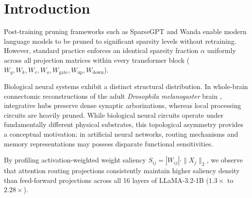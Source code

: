 \documentclass{article}
\begin{document}
\section{Introduction}
Post-training pruning frameworks such as SparseGPT \cite{frantar2023sparsegpt} and Wanda \cite{sun2023wanda} enable modern language models to be pruned to significant sparsity levels without retraining. However, standard practice enforces an identical sparsity fraction $\alpha$ uniformly across all projection matrices within every transformer block ($W_q, W_k, W_v, W_o, W_{\text{gate}}, W_{\text{up}}, W_{\text{down}}$).

Biological neural systems exhibit a distinct structural distribution. In whole-brain connectomic reconstructions of the adult \textit{Drosophila melanogaster} brain \cite{dorkenwald2024neuronal, schlegel2024whole}, integrative hubs preserve dense synaptic arborizations, whereas local processing circuits are heavily pruned. While biological neural circuits operate under fundamentally different physical substrates, this topological asymmetry provides a conceptual motivation: in artificial neural networks, routing mechanisms and memory representations may possess disparate functional sensitivities.

By profiling activation-weighted weight saliency $S_{ij} = |W_{ij}| \cdot \|X_j\|_2$, we observe that attention routing projections consistently maintain higher saliency density than feed-forward projections across all 16 layers of LLaMA-3.2-1B ($1.3\times$ to $2.28\times$).
\end{document}
